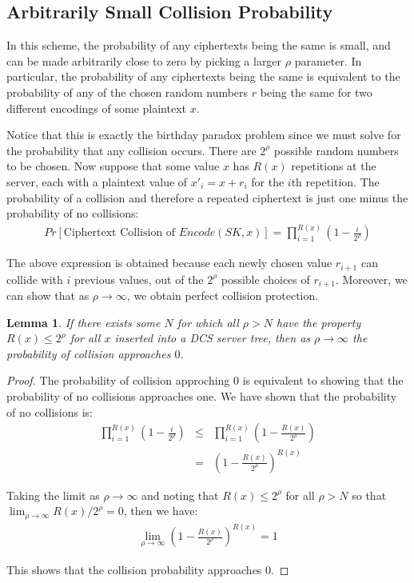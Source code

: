 \documentclass[12pt]{article}
\newtheorem{lemma}{Lemma}
\begin{document}
\subsection{Arbitrarily Small Collision Probability}

In this scheme, the probability of any ciphertexts being the same is small, and can be made arbitrarily close to zero by picking a larger $\rho$ parameter. In particular, the probability of any ciphertexts being the same is equivalent to the probability of any of the chosen random numbers $r$ being the same for two different encodings of some plaintext $x$.

Notice that this is exactly the birthday paradox problem since we must solve for the probability that any collision occurs. There are $2^\rho$ possible random numbers to be chosen. Now suppose that some value $x$ has $R(x)$ repetitions at the server, each with a plaintext value of $x'_i = x + r_i$ for the $i$th repetition. The probability of a collision and therefore a repeated ciphertext is just one minus the probability of no collisions:
\begin{eqnarray}
  Pr[\textrm{Ciphertext Collision of } Encode(SK, x)] = \prod_{i=1}^{R(x)} \left(1 - \frac{i}{2^{\rho}} \right)
\end{eqnarray}

The above expression is obtained because each newly chosen value $r_{i+1}$ can collide with $i$ previous values, out of the $2^{\rho}$ possible choices of $r_{i+1}$. Moreover, we can show that as $\rho \to \infty$, we obtain perfect collision protection. \\

\begin{lemma}
  If there exists some $N$ for which all $\rho > N$ have the property $R(x) \leq 2^{\rho}$ for all $x$ inserted into a DCS server tree, then as $\rho \to \infty$ the probability of collision approaches $0$.
\end{lemma}
\begin{proof}
  The probability of collision approching 0 is equivalent to showing that the probability of no collisions approaches one. We have shown that the probability of no collisions is:
  \begin{eqnarray}
    \prod_{i=1}^{R(x)} \left(1 - \frac{i}{2^{\rho}} \right) &\leq& \prod_{i=1}^{R(x)} \left(1 - \frac{R(x)}{2^{\rho}} \right) \\
                                                    &=& \left(1 - \frac{R(x)}{2^{\rho}} \right)^{R(x)}
  \end{eqnarray}

  Taking the limit as $\rho \to \infty$ and noting that $R(x) \leq 2^{\rho}$ for all $\rho > N$ so that $\lim_{\rho \to \infty} R(x) / 2^{\rho} = 0$, then we have:
  \begin{eqnarray}
    \lim_{\rho \to \infty} \left(1 - \frac{R(x)}{2^{\rho}} \right)^{R(x)} = 1
  \end{eqnarray}

  This shows that the collision probability approaches 0.
\end{proof}
\end{document}
